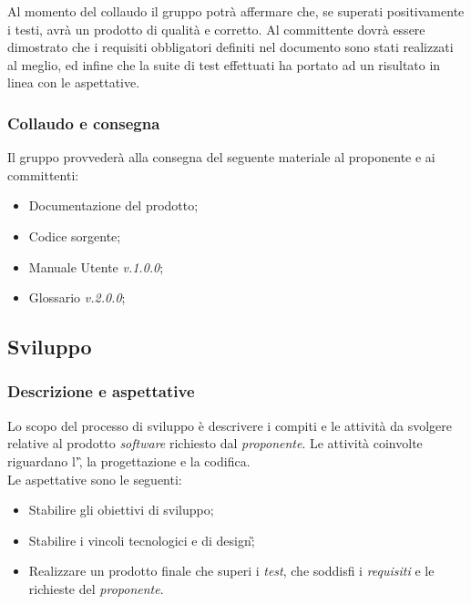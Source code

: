 Al momento del collaudo il gruppo potrà affermare che, se superati positivamente i testi, avrà un prodotto di qualità e 
corretto. \aCapo{}
Al committente dovrà essere dimostrato che i requisiti obbligatori definiti nel documento \AdR{} sono stati realizzati al meglio, ed infine 
che la suite di test effettuati ha portato ad un risultato in linea con le aspettative.

\subsubsection{Collaudo e consegna}

Il gruppo \teamname{} provvederà alla consegna del seguente materiale al proponente e ai committenti:
\begin{itemize}
	\item Documentazione del prodotto;
	\item Codice sorgente;
	\item Manuale Utente \textit{v.1.0.0};
	\item Glossario \textit{v.2.0.0};
\end{itemize}

\subsection{Sviluppo}
\subsubsection{Descrizione e aspettative}
Lo scopo del processo di sviluppo è descrivere i compiti e le attività da svolgere relative al prodotto \emph{software} richiesto dal \emph{proponente}.
Le attività coinvolte riguardano l'\AdR{}\G, la progettazione e la codifica. \\
Le aspettative sono le seguenti:
\begin{itemize}
	\item Stabilire gli obiettivi di sviluppo;
	\item Stabilire i vincoli tecnologici e di design\G;
	\item Realizzare un prodotto finale che superi i \emph{test}, che soddisfi i \emph{requisiti} e le richieste del \emph{proponente}. 
\end{itemize}

